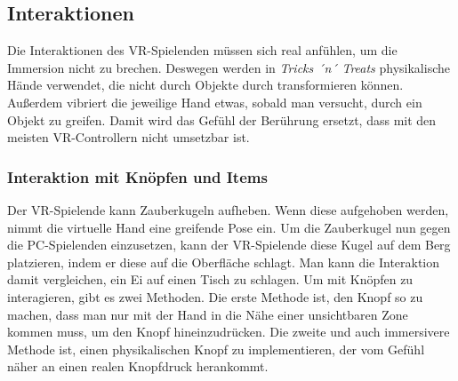 \subsection{Interaktionen}
Die Interaktionen des VR-Spielenden müssen sich real anfühlen, um die Immersion nicht zu brechen. Deswegen werden in \emph{Tricks ´n´ Treats} physikalische Hände verwendet, die nicht durch Objekte durch transformieren können. Außerdem vibriert die jeweilige Hand etwas, sobald man versucht, durch ein Objekt zu greifen. Damit wird das Gefühl der Berührung ersetzt, dass mit den meisten VR-Controllern nicht umsetzbar ist.

\subsubsection{Interaktion mit Knöpfen und Items}
Der VR-Spielende kann Zauberkugeln aufheben. Wenn diese aufgehoben werden, nimmt die virtuelle Hand eine greifende Pose ein. Um die Zauberkugel nun gegen die PC-Spielenden einzusetzen, kann der VR-Spielende diese Kugel auf dem Berg platzieren, indem er diese auf die Oberfläche schlagt. Man kann die Interaktion damit vergleichen, ein Ei auf einen Tisch zu schlagen. Um mit Knöpfen zu interagieren, gibt es zwei Methoden. Die erste Methode ist, den Knopf so zu machen, dass man nur mit der Hand in die Nähe einer unsichtbaren Zone kommen muss, um den Knopf hineinzudrücken. Die zweite und auch immersivere Methode ist, einen physikalischen Knopf zu implementieren, der vom Gefühl näher an einen realen Knopfdruck herankommt.